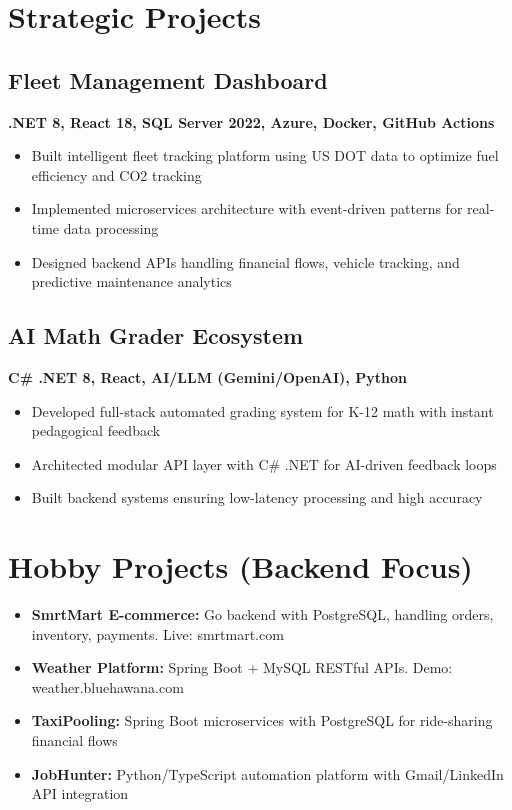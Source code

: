 \documentclass[10pt,a4paper]{article}
\begin{document}
\section*{Strategic Projects}

\subsection*{Fleet Management Dashboard}
\textbf{.NET 8, React 18, SQL Server 2022, Azure, Docker, GitHub Actions}
\begin{itemize}[noitemsep]
\item Built intelligent fleet tracking platform using US DOT data to optimize fuel efficiency and CO2 tracking
\item Implemented microservices architecture with event-driven patterns for real-time data processing
\item Designed backend APIs handling financial flows, vehicle tracking, and predictive maintenance analytics
\end{itemize}

\subsection*{AI Math Grader Ecosystem}
\textbf{C\# .NET 8, React, AI/LLM (Gemini/OpenAI), Python}
\begin{itemize}[noitemsep]
\item Developed full-stack automated grading system for K-12 math with instant pedagogical feedback
\item Architected modular API layer with C\# .NET for AI-driven feedback loops
\item Built backend systems ensuring low-latency processing and high accuracy
\end{itemize}

\section*{Hobby Projects (Backend Focus)}
\begin{itemize}[noitemsep]
\item \textbf{SmrtMart E-commerce:} Go backend with PostgreSQL, handling orders, inventory, payments. Live: smrtmart.com
\item \textbf{Weather Platform:} Spring Boot + MySQL RESTful APIs. Demo: weather.bluehawana.com
\item \textbf{TaxiPooling:} Spring Boot microservices with PostgreSQL for ride-sharing financial flows
\item \textbf{JobHunter:} Python/TypeScript automation platform with Gmail/LinkedIn API integration
\end{itemize}
\end{document}

